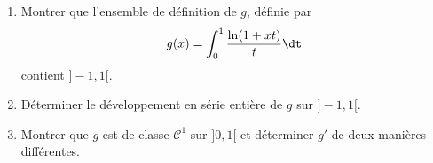 \documentclass[a4paper,10pt]{report}
\begin{document}
\begin{Exercice}{} \begin{enumerate}
\item Montrer que l'ensemble de définition de $g$, définie par 
$$ g(x) = \int_{0}^1 \dfrac{\ln(1+xt)}{t} \dt$$
contient $]-1,1[$.
\item Déterminer le développement en série entière de $g$ sur $]-1,1[$.
\item Montrer que $g$ est de classe $\mathcal{C}^1$ sur $]0,1[$ et déterminer $g'$ de deux manières différentes.
\end{enumerate}
\end{Exercice}

\end{document}
